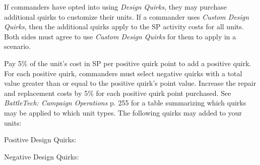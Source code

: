 If commanders have opted into using \emph{Design Quirks}, they may purchase additional quirks to customize their units.
If a commander uses \emph{Custom Design Quirks}, then the additional quirks apply to the SP activity costs for all units.
Both sides must agree to use \emph{Custom Design Quirks} for them to apply in a scenario.

Pay 5\% of the unit's cost in SP per positive quirk point to add a positive quirk.
For each positive quirk, commanders must select negative quirks with a total value greater than or equal to the positive quirk's point value.
Increase the repair and replacement costs by 5\% for each positive quirk point purchased.
See \emph{BattleTech: Campaign Operations} p. 255 for a table summarizing which quirks may be applied to which unit types. The following quirks may added to your units:

Positive Design Quirks:



Negative Design Quirks:


